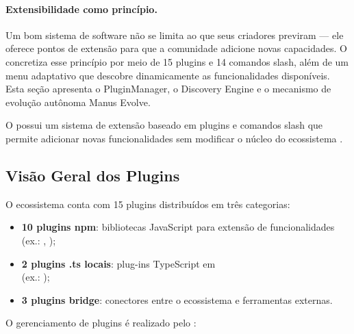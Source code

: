 \paragraph{Extensibilidade como princípio.} Um bom sistema de software não se limita ao que seus criadores previram — ele oferece pontos de extensão para que a comunidade adicione novas capacidades. O \opencodeeco{} concretiza esse princípio por meio de 15 plugins e 14 comandos slash, além de um menu adaptativo que descobre dinamicamente as funcionalidades disponíveis. Esta seção apresenta o PluginManager, o Discovery Engine e o mecanismo de evolução autônoma Manus Evolve.

O \opencodeeco{} possui um sistema de extensão baseado em plugins e
comandos slash que permite adicionar novas funcionalidades sem modificar
o núcleo do ecossistema \cite{pressman2016engenharia,
fowler2019refactoring}.

\subsection{Visão Geral dos Plugins}
\label{subsec:plugins-visao}

O ecossistema conta com 15 plugins distribuídos em três categorias:

\begin{itemize}
\item \textbf{10 plugins npm}: bibliotecas JavaScript para extensão de
funcionalidades (ex.: ,
);
\item \textbf{2 plugins .ts locais}: plug-ins TypeScript em \\%
\hspace*{2em} (ex.: );
\item \textbf{3 plugins bridge}: conectores entre o ecossistema e
ferramentas externas.
\end{itemize}

O gerenciamento de plugins é realizado pelo :

